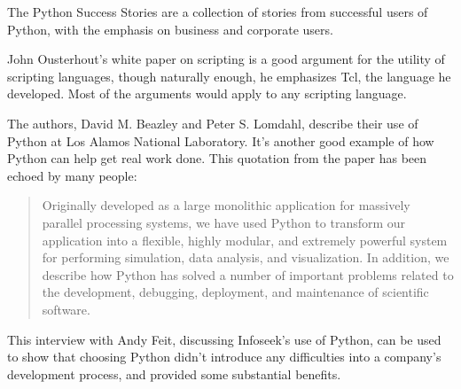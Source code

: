 \documentclass{howto}
\begin{document}
\begin{definitions}



The Python Success Stories are a collection of stories from successful
users of Python, with the emphasis on business and corporate users.
 


 
John Ousterhout's white paper on scripting is a good argument for the
utility of scripting languages, though naturally enough, he emphasizes
Tcl, the language he developed.  Most of the arguments would apply to
any scripting language.


The authors, David M. Beazley and Peter S. Lomdahl, 
describe their use of Python at Los Alamos National Laboratory.
It's another good example of how Python can help get real work done.
This quotation from the paper has been echoed by many people:

\begin{quotation}
       Originally developed as a large monolithic application for
       massively parallel processing systems, we have used Python to
       transform our application into a flexible, highly modular, and
       extremely powerful system for performing simulation, data
       analysis, and visualization. In addition, we describe how Python
       has solved a number of important problems related to the
       development, debugging, deployment, and maintenance of scientific
       software.
\end{quotation}

 
This interview with Andy Feit, discussing Infoseek's use of Python, can be
used to show that choosing Python didn't introduce any difficulties
into a company's development process, and provided some substantial benefits.



\end{definitions}
\end{document}
